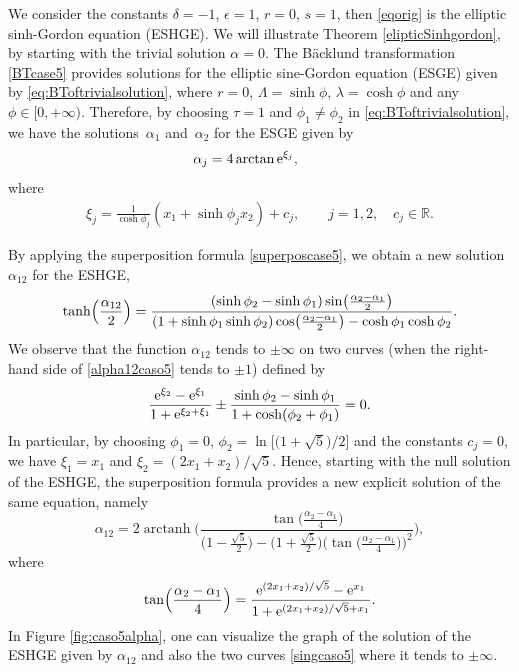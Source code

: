 \documentclass[pdftex]{sigma}
\numberwithin{equation}{section}
\begin{document}
\begin{Example}%
 We consider the constants $\delta=-1$, $\epsilon=1$, $r=0$, $s=1$,
then \eqref{eqorig} is the elliptic sinh-Gordon equation (ESHGE). We will illustrate Theorem \ref{elipticSinhgordon}, by starting with the trivial solution $\alpha=0$. The B\"acklund transformation \eqref{BTcase5} provides solutions for the elliptic sine-Gordon equation (ESGE) given by \eqref{eq:BToftrivialsolution}, where $r=0$,
 $\Lambda=\sinh\phi$, $\lambda=\cosh\phi$ and any \mbox{$\phi\in[0,+\infty)$}.
Therefore, by choosing $\tau=1$ and $\phi_1\neq \phi_2$ in
\eqref{eq:BToftrivialsolution}, we have the solutions~$\alpha_1$ and~$\alpha_2$ for the ESGE given by
\begin{gather*}
\alpha_j=4 \arctan {\rm e}^{\xi_j }, \qquad
\end{gather*}
where
\begin{gather*}
\xi_j=\frac{1}{\cosh \phi_j}(x_1+\sinh\phi_jx_2)+c_j, \qquad j=1,2, \quad c_j\in{\mathbb{R}}.
\end{gather*}

 By applying the superposition formula \eqref{superposcase5}, we obtain a new solution $\alpha_{12}$ for the ESHGE,
\begin{equation}\label{alpha12caso5}
 \tanh\Bigl(\frac{\alpha_{12}}{2}\Bigr)=
 \frac{(\sinh \phi_2-\sinh \phi_1)\sin\bigl(\frac{\alpha_2-\alpha_1}{2 } \bigr) }{(1+\sinh\phi_1 \sinh\phi_2)
 \cos\bigl(\frac{\alpha_2-\alpha_1}{2 } \bigr)-\cosh\phi_1\cosh\phi_2}.
 \end{equation}
We observe that the function $\alpha_{12}$ tends to $\pm\infty$ on two curves (when the right-hand side of \eqref{alpha12caso5} tends to $\pm 1$) defined by
\begin{equation}\label{singcaso5}
\frac{{\rm e}^{\xi_2}-{\rm e}^{\xi_1 }} {1+{\rm e}^{\xi_2+\xi_1}}\pm \frac {\sinh\phi_2-\sinh\phi_1}{1+\cosh(\phi_2+\phi_1)}=0.
\end{equation}
In particular, by choosing $\phi_1=0$, $\phi_2=\ln\bigl[\bigl(1+\sqrt{5}\bigr)/2\bigr]$ and the constants $c_j=0$,
we have $\xi_1=x_1$ and $\xi_2=(2x_1+x_2)/\sqrt{5} $.
Hence, starting with the null solution of the ESHGE, the superposition formula provides
a new explicit solution of the same equation, namely
\begin{equation*}%
\alpha_{12}= 2 \operatorname{arctanh}\Biggl( \frac{ \tan\bigl(\frac{\alpha_2-\alpha_1} {4 } \bigr) }
{\bigl(1-\frac{\sqrt{5}}{2}\bigr)-\bigl(1+\frac{\sqrt{5}}{2}\bigr) \bigl(\tan\bigl(\frac{\alpha_2-\alpha_1} {4 } \bigr) \bigr)^2}
 \Biggr),
\end{equation*}
where
\[
\tan\Bigl(\frac{\alpha_2-\alpha_1} {4 } \Bigr)= \frac{{\rm e}^{(2x_1+x_2)/\sqrt{5}}-{\rm e}^{x_1} } {1+ {\rm e}^{(2x_1+x_2)/\sqrt{5}+x_1} }.
\]
In Figure \ref{fig:caso5alpha}, one can visualize the graph of the solution of the ESHGE given by $\alpha_{12}$ and also the two curves \eqref{singcaso5} where it tends to $\pm\infty$.


\end{Example}
\end{document}
